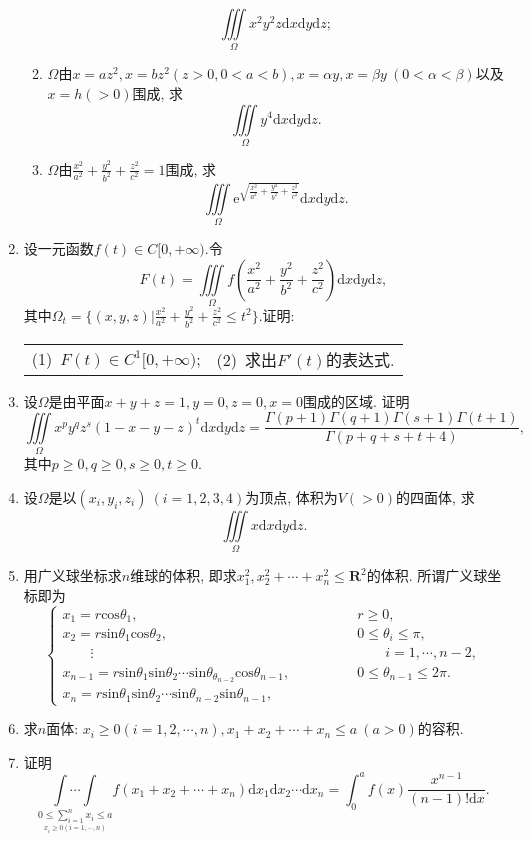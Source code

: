 \begin{enumerate}
\begin{enumerate}
	$$ \displaystyle{\underset{\Omega}{\iiint}x^2y^2z\mathrm{d}x\mathrm{d}y\mathrm{d}z};$$
	\item $\Omega$由$x=az^2,x=bz^2(z>0,0<a<b), x=\alpha y,x=\beta y\ (0<\alpha<\beta)$以及$x=h (>0)$围成, 求$$
	\displaystyle{\underset{\Omega}{\iiint}y^4\mathrm{d}x\mathrm{d}y\mathrm{d}z}.$$
	\item $\Omega$由$\frac{x^2}{a^2}+\frac{y^2}{b^2}+\frac{z^2}{c^2}=1$围成, 求
	$$ \displaystyle{\underset{\Omega}{\iiint}\mathrm{e}^{\sqrt{\frac{x^2}{a^2}+\frac{y^2}{b^2}+\frac{z^2}{c^2}}}\mathrm{d}x\mathrm{d}y\mathrm{d}z}.$$
\end{enumerate}
\item 设一元函数$f(t)\in C[0,+\infty)$.令
$$ F(t)=\displaystyle{\underset{\Omega}{\iiint}f(\frac{x^2}{a^2}+\frac{y^2}{b^2}+\frac{z^2}{c^2})\mathrm{d}x\mathrm{d}y\mathrm{d}z},$$
其中$\Omega_t=\{(x,y,z)|\frac{x^2}{a^2}+\frac{y^2}{b^2}+\frac{z^2}{c^2}\le t^2\}$.证明:
\begin{table}[H]
	\begin{tabular}{ll}
		\qquad (1)\ $F(t)\in C^{1}[0,+\infty)$;\qquad \qquad \qquad &(2)\ 求出$F'(t)$的表达式.
	\end{tabular}
\end{table}
\item 设$\Omega$是由平面$x+y+z=1, y=0, z=0, x=0$围成的区域. 证明
$$ \displaystyle{\underset{\Omega}{\iiint}x^py^qz^s(1-x-y-z)^t\mathrm{d}x\mathrm{d}y\mathrm{d}z}=\frac{\Gamma(p+1)\Gamma(q+1)\Gamma(s+1)\Gamma(t+1)}{\Gamma(p+q+s+t+4)},$$
其中$p \ge 0,q\ge 0,s\ge 0,t\ge 0$.
\item 设$\Omega$是以$(x_i,y_i,z_i)\ (i=1,2,3,4)$为顶点, 体积为$V(>0)$的四面体, 求$$
\displaystyle{\underset{\Omega}{\iiint}x\mathrm{d}x\mathrm{d}y\mathrm{d}z.}$$
\item 用广义球坐标求$n$维球的体积, 即求$x_1^2,x_2^2+\cdots+x_n^2\le \bm{R}^2$的体积. 所谓广义球坐标即为
$$\begin{cases}
x_1=r\mathrm{cos}\theta_1,&\qquad \qquad r\ge0,\\
x_2=r\mathrm{sin}\theta_1\mathrm{cos}\theta_2,& \qquad \qquad 0\le \theta_i\le \pi,\\
\qquad \vdots&\qquad\qquad\qquad i=1,\cdots,n-2,\\
x_{n-1}=r\mathrm{sin}\theta_1\mathrm{sin}\theta_2\cdots\mathrm{sin}\theta_{\theta_{n-2}}\mathrm{cos}\theta_{n-1},&\qquad \qquad  0\le \theta_{n-1}\le 2\pi.\\
x_n=r\mathrm{sin}\theta_1\mathrm{sin}\theta_2\cdots\mathrm{sin}\theta_{n-2}\mathrm{sin}\theta_{n-1},&\qquad
\end{cases}$$
\item 求$n$面体: $x_i\ge 0(i=1,2,\cdots,n),x_1+x_2+\cdots+x_n\le a\ (a>0)$的容积.
\item 证明
$$\displaystyle{\underset{\underset{x_i\ge 0(i=1,\cdots,n) }{0\le \sum\limits_{i=1}^{n}x_i\le a}}{\int\dotsi\int}f(x_1+x_2+\cdots+x_n)\mathrm{d}x_1\mathrm{d}x_2\cdots\mathrm{d}x_n}=\int_{0}^{a}f(x)\frac{x^{n-1}}{(n-1)!\mathrm{d}x}.$$
\end{enumerate}

